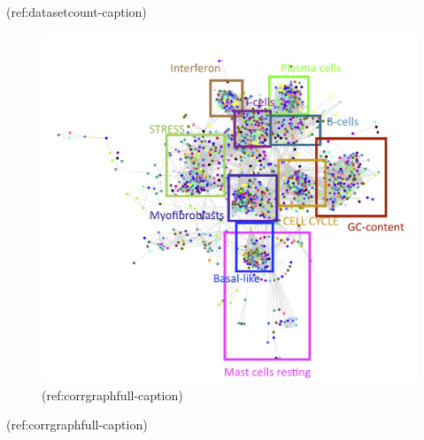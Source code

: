 \documentclass[12pt,]{book}
\theoremstyle{definition}
\theoremstyle{definition}
\theoremstyle{definition}
\theoremstyle{remark}
\begin{document}
(ref:datasetcount-caption)

\begin{figure}

{\centering \includegraphics[width=1\linewidth,height=0.5\textheight]{figures-ext/full_02_recip_color_annot} 

}

\caption[Correlation graph of metagenes]{(ref:corrgraphfull-caption)}\label{fig:corrgraphfull}
\end{figure}

(ref:corrgraphfull-caption)
\end{document}
